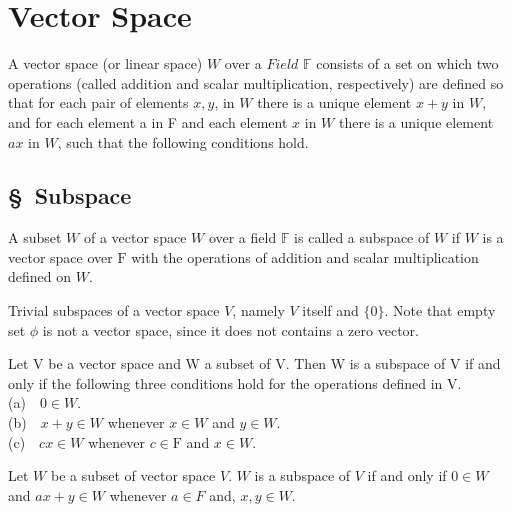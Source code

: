 



\chapter{Vector Space}
 
\begin{defn}
 A vector space (or linear space) $W$ over a $Field$ $\mathbb{F}$ consists of a set on which two operations (called addition and scalar multiplication, respectively) are defined so that for each pair of elements $x, y$, in $W$ there is a unique element $x+y$ in $W$, and for each element a in F and each element $x$ in $W$ there is a unique element $ax$ in $W$, such that the following conditions hold.
\end{defn} 

\section*{\S\ Subspace }

\begin{defn}[Subspace]
	A subset $W$ of a vector space $W$ over a field $\mathbb{F}$ is called a subspace of $W$ if $W$ is a vector space over $\mathrm{F}$ with the operations of addition and scalar multiplication defined on $W$.
	
\end{defn}



\begin{rmk*}
	Trivial subspaces of a vector space $V$, namely $V$ itself and $\{0\}$. Note that empty set $\phi$ is not a vector space, since it does not contains a zero vector.
\end{rmk*}

\begin{thm}Let V be a vector space and W a subset of V. Then W is a subspace of V if and only if the following three conditions hold for the operations defined in V.
\\
(a)\ \ $0 \in W.$ \\
(b)\ \ $x+y \in W$ whenever $x \in W$ and $y \in W.$ \\
(c)\ \ $cx \in W$ whenever $c \in \mathrm{F}$ and $x \in W.$ \\

\end{thm}

\begin{cor}
	Let $W$ be a subset of vector space $V$. $W$ is a subspace of $V$ if and only if $0\in W$ and $ax+y \in W$ whenever $a \in F$ and, $ x,y \in W$.
\end{cor}

